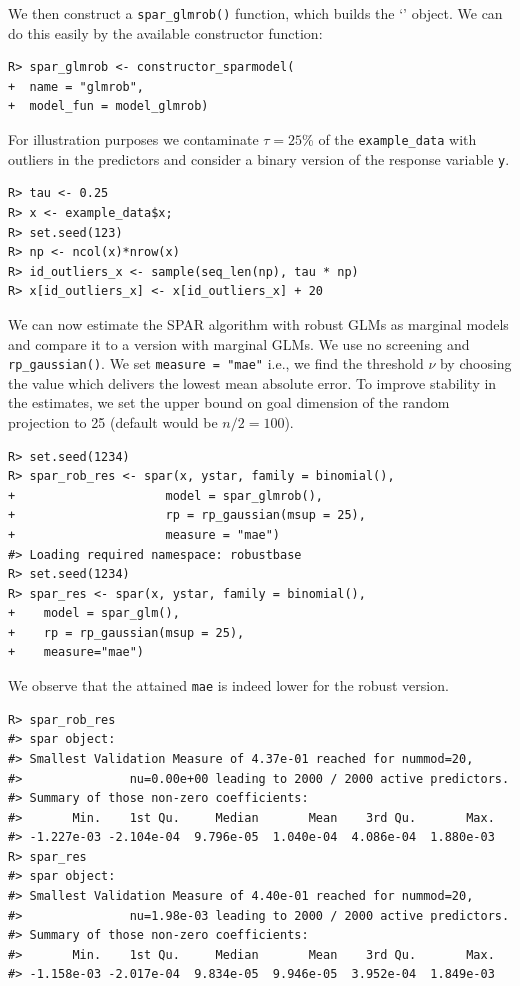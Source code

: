 \documentclass[
  article,
  nojss]{jss}
\newcommand{\class}[1]{`\code{#1}'}
\begin{document}
We then construct a \texttt{spar\_glmrob()} function, which builds the
\class{sparmodel} object. We can do this easily by the available
constructor function:

\begin{verbatim}
R> spar_glmrob <- constructor_sparmodel(
+  name = "glmrob",
+  model_fun = model_glmrob)
\end{verbatim}

For illustration purposes we contaminate \(\tau=25\)\% of the
\texttt{example\_data} with outliers in the predictors and consider a
binary version of the response variable \texttt{y}.

\begin{verbatim}
R> tau <- 0.25
R> x <- example_data$x;
R> set.seed(123)
R> np <- ncol(x)*nrow(x)
R> id_outliers_x <- sample(seq_len(np), tau * np)
R> x[id_outliers_x] <- x[id_outliers_x] + 20
\end{verbatim}

We can now estimate the SPAR algorithm with robust GLMs as marginal
models and compare it to a version with marginal GLMs. We use no
screening and \texttt{rp\_gaussian()}. We set \texttt{measure\ =\ "mae"}
i.e., we find the threshold \(\nu\) by choosing the value which delivers
the lowest mean absolute error. To improve stability in the estimates,
we set the upper bound on goal dimension of the random projection to 25
(default would be \(n/2=100\)).

\begin{verbatim}
R> set.seed(1234)
R> spar_rob_res <- spar(x, ystar, family = binomial(),
+                     model = spar_glmrob(),
+                     rp = rp_gaussian(msup = 25),
+                     measure = "mae")
#> Loading required namespace: robustbase
R> set.seed(1234)
R> spar_res <- spar(x, ystar, family = binomial(),
+    model = spar_glm(),
+    rp = rp_gaussian(msup = 25),
+    measure="mae")
\end{verbatim}

We observe that the attained \texttt{mae} is indeed lower for the robust
version.

\begin{verbatim}
R> spar_rob_res
#> spar object:
#> Smallest Validation Measure of 4.37e-01 reached for nummod=20,
#>               nu=0.00e+00 leading to 2000 / 2000 active predictors.
#> Summary of those non-zero coefficients:
#>       Min.    1st Qu.     Median       Mean    3rd Qu.       Max. 
#> -1.227e-03 -2.104e-04  9.796e-05  1.040e-04  4.086e-04  1.880e-03
R> spar_res
#> spar object:
#> Smallest Validation Measure of 4.40e-01 reached for nummod=20,
#>               nu=1.98e-03 leading to 2000 / 2000 active predictors.
#> Summary of those non-zero coefficients:
#>       Min.    1st Qu.     Median       Mean    3rd Qu.       Max. 
#> -1.158e-03 -2.017e-04  9.834e-05  9.946e-05  3.952e-04  1.849e-03
\end{verbatim}
\end{document}
